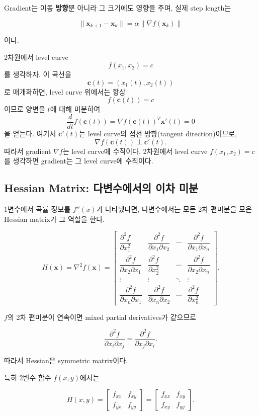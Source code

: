 \documentclass[11pt,a4paper]{article}
\begin{document}
Gradient는 이동 \textbf{방향}뿐 아니라 그 크기에도 영향을 주며,
실제 step length는

\[
    \|\mathbf{x}_{k+1}-\mathbf{x}_k\|
    =
    \alpha\|\nabla f(\mathbf{x}_k)\|
\]

이다. 

2차원에서 level curve
\[
f(x_1,x_2)=c
\]
를 생각하자. 이 곡선을
\[
\mathbf{c}(t)=(x_1(t),x_2(t))
\]
로 매개화하면, level curve 위에서는 항상
\[
f(\mathbf{c}(t))=c
\]
이므로 양변을 $t$에 대해 미분하여
\[
\frac{d}{dt}f(\mathbf{c}(t))
=
\nabla f(\mathbf{c}(t))^T\mathbf{x}'(t)
=0
\]
을 얻는다. 여기서 $\mathbf{c}'(t)$는 level curve의 접선 방향(tangent
direction)이므로,
\[
\nabla f(\mathbf{c}(t))\perp \mathbf{c}'(t).
\]
따라서 gradient $\nabla f$는 level curve에 수직이다.
2차원에서 level curve $f(x_1,x_2)=c$를 생각하면 gradient는 그 level curve에
수직이다. 


\subsection{Hessian Matrix: 다변수에서의 이차 미분}

1변수에서 곡률 정보를 $f''(x)$가 나타냈다면, 다변수에서는 모든
2차 편미분을 모은 Hessian matrix가 그 역할을 한다.

\[
H(\mathbf{x})
=
\nabla^2 f(\mathbf{x})
=
\begin{bmatrix}
\dfrac{\partial^2 f}{\partial x_1^2}
&
\dfrac{\partial^2 f}{\partial x_1\partial x_2}
&
\cdots
&
\dfrac{\partial^2 f}{\partial x_1\partial x_n}
\\[2mm]
\dfrac{\partial^2 f}{\partial x_2\partial x_1}
&
\dfrac{\partial^2 f}{\partial x_2^2}
&
\cdots
&
\dfrac{\partial^2 f}{\partial x_2\partial x_n}
\\
\vdots & \vdots & \ddots & \vdots
\\
\dfrac{\partial^2 f}{\partial x_n\partial x_1}
&
\dfrac{\partial^2 f}{\partial x_n\partial x_2}
&
\cdots
&
\dfrac{\partial^2 f}{\partial x_n^2}
\end{bmatrix}.
\]

$f$의 2차 편미분이 연속이면 mixed partial derivatives가 같으므로

\[
    \frac{\partial^2f}{\partial x_i\partial x_j}
    =
    \frac{\partial^2f}{\partial x_j\partial x_i}.
\]

따라서 Hessian은 symmetric matrix이다.

특히 2변수 함수 $f(x,y)$에서는

\[
    H(x,y)
    =
    \begin{bmatrix}
    f_{xx} & f_{xy}\\
    f_{yx} & f_{yy}
    \end{bmatrix}
    =
    \begin{bmatrix}
    f_{xx} & f_{xy}\\
    f_{xy} & f_{yy}
    \end{bmatrix}.
\]
\end{document}
